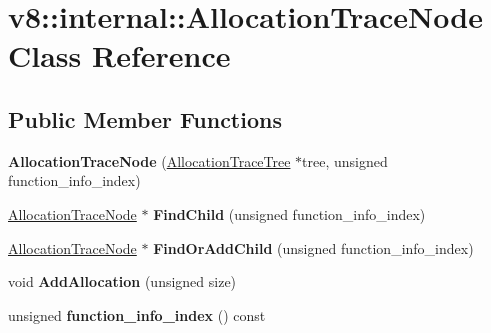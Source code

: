 \hypertarget{classv8_1_1internal_1_1_allocation_trace_node}{}\section{v8\+:\+:internal\+:\+:Allocation\+Trace\+Node Class Reference}
\label{classv8_1_1internal_1_1_allocation_trace_node}
\subsection*{Public Member Functions}
\begin{DoxyCompactItemize}
\item 
\hypertarget{classv8_1_1internal_1_1_allocation_trace_node_aca8caa93d6a5309e2fc2529b71a5a70a}{}{\bfseries Allocation\+Trace\+Node} (\hyperlink{classv8_1_1internal_1_1_allocation_trace_tree}{Allocation\+Trace\+Tree} $\ast$tree, unsigned function\+\_\+info\+\_\+index)\label{classv8_1_1internal_1_1_allocation_trace_node_aca8caa93d6a5309e2fc2529b71a5a70a}

\item 
\hypertarget{classv8_1_1internal_1_1_allocation_trace_node_afbb942277677c19a257ff8781f034c1d}{}\hyperlink{classv8_1_1internal_1_1_allocation_trace_node}{Allocation\+Trace\+Node} $\ast$ {\bfseries Find\+Child} (unsigned function\+\_\+info\+\_\+index)\label{classv8_1_1internal_1_1_allocation_trace_node_afbb942277677c19a257ff8781f034c1d}

\item 
\hypertarget{classv8_1_1internal_1_1_allocation_trace_node_a780262d490b639c1782e3a7212297709}{}\hyperlink{classv8_1_1internal_1_1_allocation_trace_node}{Allocation\+Trace\+Node} $\ast$ {\bfseries Find\+Or\+Add\+Child} (unsigned function\+\_\+info\+\_\+index)\label{classv8_1_1internal_1_1_allocation_trace_node_a780262d490b639c1782e3a7212297709}

\item 
\hypertarget{classv8_1_1internal_1_1_allocation_trace_node_ab3952f0610968cabfdb6a6134395f4a8}{}void {\bfseries Add\+Allocation} (unsigned size)\label{classv8_1_1internal_1_1_allocation_trace_node_ab3952f0610968cabfdb6a6134395f4a8}

\item 
\hypertarget{classv8_1_1internal_1_1_allocation_trace_node_a7615a9d517ad2c292ef197fa5178afef}{}unsigned {\bfseries function\+\_\+info\+\_\+index} () const \label{classv8_1_1internal_1_1_allocation_trace_node_a7615a9d517ad2c292ef197fa5178afef}


\end{DoxyCompactItemize}
